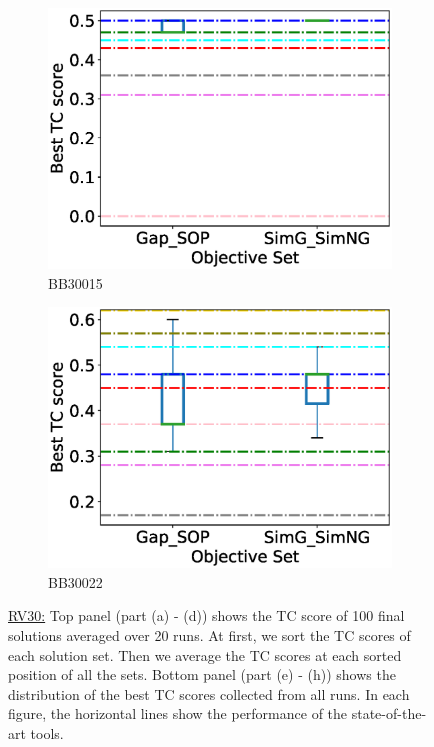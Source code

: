 \begin{figure}[!htbp]
\begin{adjustwidth}{-1cm}{-1cm}
\begin{subfigure}{0.22\textwidth}
			\includegraphics[width=\columnwidth]{Figure/summary/precomputedInit/Balibase/BB30015_objset_tc_rank_2}
			\caption{BB30015}
		\end{subfigure}
		\begin{subfigure}{0.22\textwidth}
			\includegraphics[width=\columnwidth]{Figure/summary/precomputedInit/Balibase/BB30022_objset_tc_rank_2}
			\caption{BB30022}
		\end{subfigure}
		\caption{\underline{RV30:} Top panel (part (a) - (d)) shows the TC score of 100 final solutions averaged over 20 runs. At first, we sort the TC scores of each solution set. Then we average the TC scores at each sorted position of all the sets. Bottom panel (part (e) - (h)) shows the distribution of the best TC scores collected from all runs. In each figure, the horizontal lines show the performance of the state-of-the-art tools.}
		\label{fig:rv30_tc}
	\end{adjustwidth}
\end{figure}

